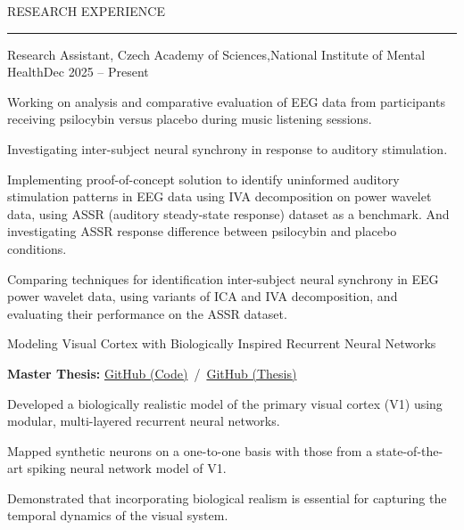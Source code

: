 \documentclass{resume} %
\renewenvironment{rSection}[1]{
\sectionskip
\textcolor{CarnegieMellonRed}{\MakeUppercase{#1}}
\sectionlineskip
\hrule
\begin{list}{}{
\setlength{\leftmargin}{1.5em}
}
\item[]
}{
\end{list}
}
\begin{document}
\begin{rSection}{Research Experience}

\begin{rProject}{\large Research Assistant, Czech Academy of Sciences,\newline National Institute of Mental Health}{Dec 2025 -- Present}{}{}
    \item Working on analysis and comparative evaluation of EEG data from participants receiving psilocybin versus placebo during music listening sessions.
    \item Investigating inter-subject neural synchrony in response to auditory stimulation.
    \item Implementing proof-of-concept solution to identify uninformed auditory stimulation patterns in EEG data using IVA decomposition on power wavelet data, using ASSR (auditory steady-state response) dataset as a benchmark. And investigating ASSR response difference between psilocybin and placebo conditions.
    \item Comparing techniques for identification inter-subject neural synchrony in EEG power wavelet data, using variants of ICA and IVA decomposition, and evaluating their performance on the ASSR dataset.
\end{rProject}

\begin{rProject}{\large Modeling Visual Cortex with Biologically Inspired Recurrent Neural Networks}{}{}{}
    \item {\bf Master Thesis:} \href{https://github.com/dbeinhauer/mcs-source}{GitHub (Code)} \,/\, \href{https://github.com/dbeinhauer/mcs-thesis}{GitHub (Thesis)}
    \item Developed a biologically realistic model of the primary visual cortex (V1) using modular, multi-layered recurrent neural networks.
    \item Mapped synthetic neurons on a one-to-one basis with those from a state-of-the-art spiking neural network model of V1.
    \item Demonstrated that incorporating biological realism is essential for capturing the temporal dynamics of the visual system.
\end{rProject}

\end{rSection}


\end{document}
